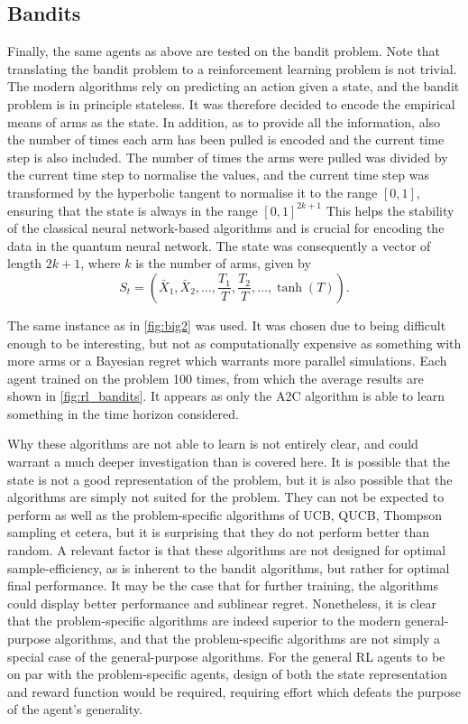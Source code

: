 \subsection{Bandits}
Finally, the same agents as above are tested on the bandit problem.
Note that translating the bandit problem to a reinforcement learning problem is not trivial.
The modern algorithms rely on predicting an action given a state, and the bandit problem is in principle stateless.
It was therefore decided to encode the empirical means of arms as the state.
In addition, as to provide all the information, also the number of times each arm has been pulled is encoded and the current time step is also included.
The number of times the arms were pulled was divided by the current time step to normalise the values, and the current time step was transformed by the hyperbolic tangent to normalise it to the range $[0, 1]$, ensuring that the state is always in the range $[0, 1]^{2k+1}$
This helps the stability of the classical neural network-based algorithms and is crucial for encoding the data in the quantum neural network.
The state was consequently a vector of length $2k+1$, where $k$ is the number of arms, given by
\begin{equation}
    \label{eq:rl_bandit_state}
    S_t = \left(
    \bar{X}_1,
    \bar{X}_2,
    \ldots,
    \frac{T_1}{T},
    \frac{T_2}{T},
    \ldots,
    \tanh(T)
    \right).
\end{equation}

The same instance as in \cref{fig:big2} was used.
It was chosen due to being difficult enough to be interesting, but not as computationally expensive as something with more arms or a Bayesian regret which warrants more parallel simulations.
Each agent trained on the problem 100 times, from which the average results are shown in \cref{fig:rl_bandits}.
It appears as only the A2C algorithm is able to learn something in the time horizon considered.

Why these algorithms are not able to learn is not entirely clear, and could warrant a much deeper investigation than is covered here.
It is possible that the state is not a good representation of the problem, but it is also possible that the algorithms are simply not suited for the problem.
They can not be expected to perform as well as the problem-specific algorithms of UCB, QUCB, Thompson sampling et cetera, but it is surprising that they do not perform better than random.
A relevant factor is that these algorithms are not designed for optimal sample-efficiency, as is inherent to the bandit algorithms, but rather for optimal final performance.
It may be the case that for further training, the algorithms could display better performance and sublinear regret.
Nonetheless, it is clear that the problem-specific algorithms are indeed superior to the modern general-purpose algorithms, and that the problem-specific algorithms are not simply a special case of the general-purpose algorithms.
For the general RL agents to be on par with the problem-specific agents, design of both the state representation and reward function would be required, requiring effort which defeats the purpose of the agent's generality.

